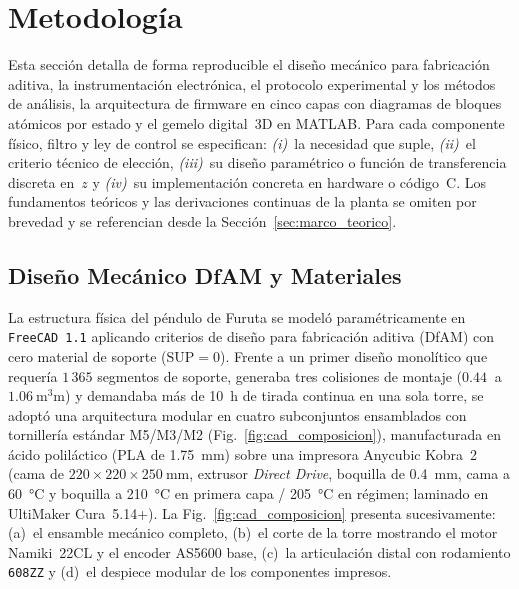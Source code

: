 \section{Metodología}\label{sec:metodologia}

Esta sección detalla de forma reproducible el diseño mecánico para fabricación aditiva, la instrumentación electrónica, el protocolo experimental y los métodos de análisis, la arquitectura de firmware en cinco capas con diagramas de bloques atómicos por estado y el gemelo digital~3D en MATLAB. Para cada componente físico, filtro y ley de control se especifican: \textit{(i)}~la necesidad que suple, \textit{(ii)}~el criterio técnico de elección, \textit{(iii)}~su diseño paramétrico o función de transferencia discreta en~$z$ y \textit{(iv)}~su implementación concreta en hardware o código~C. Los fundamentos teóricos y las derivaciones continuas de la planta se omiten por brevedad y se referencian desde la Sección~\ref{sec:marco_teorico}.

\subsection{Diseño Mecánico DfAM y Materiales}\label{subsec:dfam}

La estructura física del péndulo de Furuta se modeló paramétricamente en \texttt{FreeCAD~1.1} aplicando criterios de diseño para fabricación aditiva (DfAM) con cero material de soporte ($\text{SUP}=0$). Frente a un primer diseño monolítico que requería $1\,365$ segmentos de soporte, generaba tres colisiones de montaje ($\qty{0.44}{}$ a $\qty{1.06}{\cubic\milli\meter}$) y demandaba más de \qty{10}{\hour} de tirada continua en una sola torre, se adoptó una arquitectura modular en cuatro subconjuntos ensamblados con tornillería estándar M5/M3/M2 (Fig.~\ref{fig:cad_composicion}), manufacturada en ácido poliláctico (PLA de \qty{1.75}{\milli\meter}) sobre una impresora Anycubic Kobra~2 (cama de $220\times 220\times\qty{250}{\milli\meter}$, extrusor \textit{Direct Drive}, boquilla de \qty{0.4}{\milli\meter}, cama a \qty{60}{\celsius} y boquilla a \qty{210}{\celsius} en primera capa / \qty{205}{\celsius} en régimen; laminado en UltiMaker Cura~5.14+). La Fig.~\ref{fig:cad_composicion} presenta sucesivamente: (a)~el ensamble mecánico completo, (b)~el corte de la torre mostrando el motor Namiki~22CL y el encoder AS5600 base, (c)~la articulación distal con rodamiento \texttt{608ZZ} y (d)~el despiece modular de los componentes impresos.

